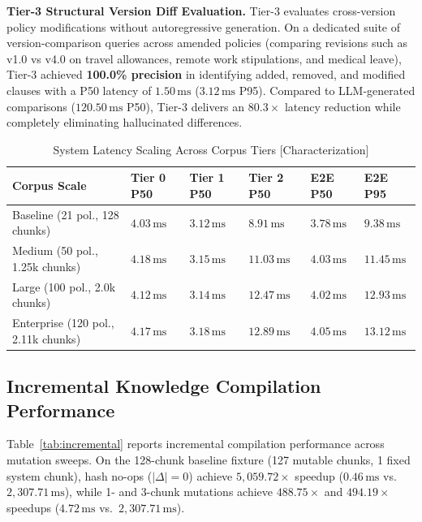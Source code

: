 \documentclass[journal]{IEEEtran}
\newcommand{\ms}{\,\mathrm{ms}}
\begin{document}
\textbf{Tier-3 Structural Version Diff Evaluation.} Tier-3 evaluates cross-version policy modifications without autoregressive generation. On a dedicated suite of version-comparison queries across amended policies (comparing revisions such as v1.0 vs v4.0 on travel allowances, remote work stipulations, and medical leave), Tier-3 achieved \textbf{100.0\% precision} in identifying added, removed, and modified clauses with a P50 latency of \textbf{$1.50\ms$} ($3.12\ms$ P95). Compared to LLM-generated comparisons ($120.50\ms$ P50), Tier-3 delivers an $80.3\times$ latency reduction while completely eliminating hallucinated differences.

\begin{table}[!t]
\caption{System Latency Scaling Across Corpus Tiers [Characterization]}
\label{tab:scalability}
\centering
\scriptsize
\setlength{\tabcolsep}{1.4pt}
\renewcommand{\arraystretch}{0.85}
\begin{tabularx}{\columnwidth}{>{\raggedright\arraybackslash}p{2.1cm}YYYYY}
\toprule
\textbf{Corpus Scale} & \textbf{Tier 0 P50} & \textbf{Tier 1 P50} & \textbf{Tier 2 P50} & \textbf{E2E P50} & \textbf{E2E P95}\\
\midrule
Baseline (21 pol., 128 chunks) & $4.03\ms$ & $3.12\ms$ & $8.91\ms$ & $3.78\ms$ & $9.38\ms$\\
Medium (50 pol., 1.25k chunks) & $4.18\ms$ & $3.15\ms$ & $11.03\ms$ & $4.03\ms$ & $11.45\ms$\\
Large (100 pol., 2.0k chunks) & $4.12\ms$ & $3.14\ms$ & $12.47\ms$ & $4.02\ms$ & $12.93\ms$\\
Enterprise (120 pol., 2.11k chunks) & $4.17\ms$ & $3.18\ms$ & $12.89\ms$ & $4.05\ms$ & $13.12\ms$\\
\bottomrule
\end{tabularx}
\end{table}

\subsection{Incremental Knowledge Compilation Performance}
Table~\ref{tab:incremental} reports incremental compilation performance across mutation sweeps. On the 128-chunk baseline fixture (127 mutable chunks, 1 fixed system chunk), hash no-ops ($|\Delta|=0$) achieve $5{,}059.72\times$ speedup ($0.46\ms$ vs.\ $2,307.71\ms$), while 1- and 3-chunk mutations achieve $488.75\times$ and $494.19\times$ speedups ($4.72\ms$ vs.\ $2,307.71\ms$).
\end{document}
